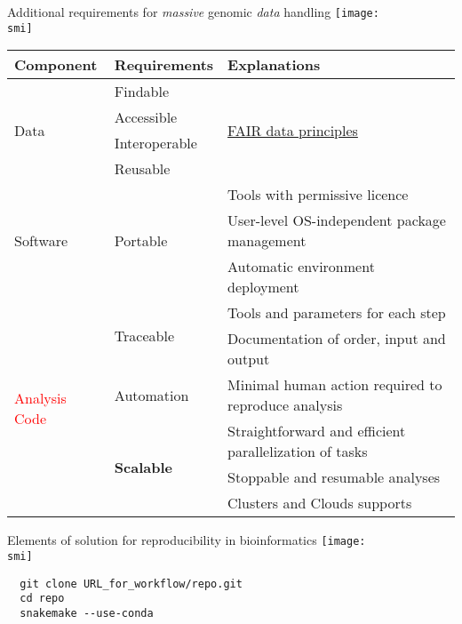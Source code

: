 \documentclass[10pt, usenames, dvipsnames]{beamer}
\def\smi{out/ln/updir/mw-gcthesis-oral/library.bib}
\begin{document}
\begin{frame}{Additional requirements for \emph{massive} genomic \emph{data} handling}
  \def\smi{out/ln/updir/mw-gcthesis-oral/ink/reproducibility/arrow_reproducibility.pdf}
  \texttt{[image: \\smi]}

  {\scriptsize
  \begin{tabular}{@{}lll@{}}
    \toprule
    Component                      & Requirements                & Explanations            \\ \midrule
    \multirow{4}{*}{\textcolor{NavyBlue}{Data}}          & Findable &  \multirow{4}{*}{\href{https://www.force11.org/group/fairgroup/fairprinciples}{FAIR data principles}}  \\
    & Accessible                        &       \\
    & Interoperable                    &        \\ 
    & Reusable                          &       \\ \midrule
    \multirow{3}{*}{\textcolor{OliveGreen}{Software}}             & \multirow{3}{*}{Portable} & Tools with permissive licence \\
    & & User-level OS-independent package management            \\
    & & Automatic environment deployment           \\ \midrule
    \multirow{6}{*}{\textcolor{Red}{Analysis Code}} & \multirow{2}{*}{Traceable} & Tools and parameters for each step       \\
    & & Documentation of order, input and output \\ \cmidrule(l){2-3}
    & Automation & Minimal human action required to reproduce analysis \\ \cmidrule(l){2-3} 
    & \multirow{3}{*}{\textbf{Scalable}} & Straightforward and efficient parallelization of tasks \\
    & & Stoppable and resumable analyses \\
    & & Clusters and Clouds supports \\ \bottomrule
  \end{tabular}
  }
\end{frame}
\begin{frame}[fragile]{Elements of solution for reproducibility in bioinformatics}
  \def\smi{out/ln/updir/mw-gcthesis-oral/ink/reproducibility/arrow_reproducibility_solutions.pdf}
  \texttt{[image: \\smi]}
  \begin{lstlisting}
  git clone URL_for_workflow/repo.git
  cd repo
  snakemake --use-conda
  \end{lstlisting}
\end{frame}
\end{document}
